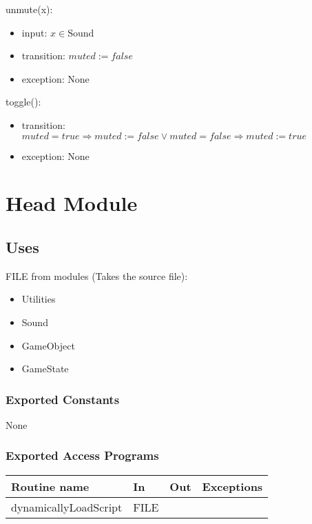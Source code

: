 \documentclass[12pt]{article}
\begin{document}
\noindent unmute(x):
\begin{itemize}
  \item input: $x \in \mbox{Sound}$
  \item transition: $muted := false$
  \item exception: None
\end{itemize}

\noindent toggle():
\begin{itemize}
  \item transition: $muted = true \Rightarrow muted := false \lor muted = false \Rightarrow muted := true$
  \item exception: None
\end{itemize}

\newpage

\section*{Head Module}

\subsection*{Uses}

FILE from modules (Takes the source file):
\begin{itemize}
  \item Utilities\\
  \item Sound\\
  \item GameObject\\
  \item GameState\\
\end{itemize}

\subsubsection*{Exported Constants}

None

\subsubsection*{Exported Access Programs}

\begin{tabular}{| l | l | l | l |}
    \hline
    \textbf{Routine name} & \textbf{In} & \textbf{Out} & \textbf{Exceptions}\\
    \hline
    dynamicallyLoadScript & FILE & ~ & ~\\
    \hline

\end{tabular}
\end{document}
